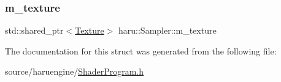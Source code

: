 \mbox{\label{structharu_1_1_sampler_a63c7dfdf6db2dd4ab18c1014ff7044af}} 
\subsubsection{\texorpdfstring{m\+\_\+texture}{m\_texture}}
{\footnotesize\ttfamily std\+::shared\+\_\+ptr$<$\mbox{\hyperlink{classharu_1_1_texture}{Texture}}$>$ haru\+::\+Sampler\+::m\+\_\+texture}



The documentation for this struct was generated from the following file\+:\begin{DoxyCompactItemize}
\item 
source/haruengine/\mbox{\hyperlink{_shader_program_8h}{Shader\+Program.\+h}}\end{DoxyCompactItemize}
